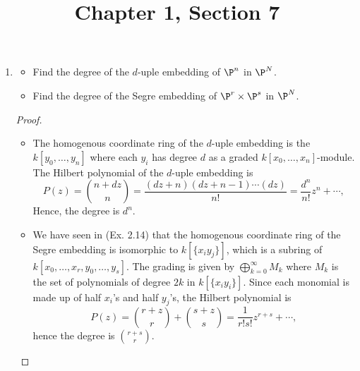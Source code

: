 \documentclass[a4paper]{article}
\title{Chapter 1, Section 7}
\begin{document}
\maketitle

\begin{enumerate} [label=\textbf{\arabic*.}, leftmargin=0cm]

  \item[\textbf{1.}] \begin{itemize}
          \item[(a)] Find the degree of the $d$-uple embedding of $\P^n$ in $\P^N$.
          \item[(b)] Find the degree of the Segre embedding of $\P^r \times \P^s$ in $\P^N$.
        \end{itemize}

        \begin{proof} $ $ \vspace{0pt}
          \begin{itemize}
            \item[(a)] The homogenous coordinate ring of the $d$-uple embedding is the $k[y_0, \dots, y_n]$ where each $y_i$ has degree $d$ as a graded $k[x_0, \dots, x_n]$-module.
                  The Hilbert polynomial of the $d$-uple embedding is
                  \begin{equation*}
                    P(z) = \binom{n + dz}{n}= \frac{(dz + n)(dz + n - 1) \cdots (dz)}{n!} = \frac{d^n}{n!}z^n + \cdots,
                  \end{equation*}
                  Hence, the degree is $d^n$.

            \item[(b)] We have seen in (Ex. 2.14) that the homogenous coordinate ring of the Segre embedding is isomorphic to $k[\{x_i y_j \}]$, which is a subring of $k[x_0, \dots, x_r, y_0, \dots, y_s]$. The grading is given by $\bigoplus_{k = 0}^\infty M_k$ where $M_k$ is the set of polynomials of degree $2k$ in $k[\{ x_i y_i \}]$. Since each monomial is made up of half $x_i$'s and half $y_j$'s, the Hilbert polynomial is
                  \begin{equation*}
                    P(z) = \binom{r + z}{r} + \binom{s + z}{s} = \frac{1}{r!s!}z^{r + s} + \cdots,
                  \end{equation*}
                  hence the degree is $\binom{r + s}{r}$.
          \end{itemize}
        \end{proof}


\end{enumerate}
\end{document}
